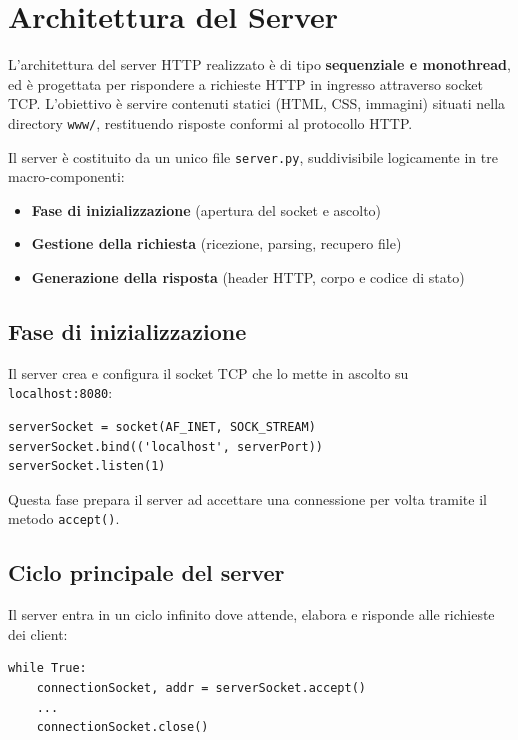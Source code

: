 \documentclass[a4paper,12pt]{report}
\begin{document}
\chapter{Architettura del Server}

L'architettura del server HTTP realizzato è di tipo \textbf{sequenziale e monothread}, ed è progettata per rispondere a richieste HTTP in ingresso attraverso socket TCP. L'obiettivo è servire contenuti statici (HTML, CSS, immagini) situati nella directory \texttt{www/}, restituendo risposte conformi al protocollo HTTP.

Il server è costituito da un unico file \texttt{server.py}, suddivisibile logicamente in tre macro-componenti:
\begin{itemize}
    \item \textbf{Fase di inizializzazione} (apertura del socket e ascolto)
    \item \textbf{Gestione della richiesta} (ricezione, parsing, recupero file)
    \item \textbf{Generazione della risposta} (header HTTP, corpo e codice di stato)
\end{itemize}

\section{Fase di inizializzazione}

Il server crea e configura il socket TCP che lo mette in ascolto su \texttt{localhost:8080}:

\begin{verbatim}
serverSocket = socket(AF_INET, SOCK_STREAM)
serverSocket.bind(('localhost', serverPort))
serverSocket.listen(1)
\end{verbatim}

Questa fase prepara il server ad accettare una connessione per volta tramite il metodo \texttt{accept()}.

\newpage

\section{Ciclo principale del server}

Il server entra in un ciclo infinito dove attende, elabora e risponde alle richieste dei client:

\begin{verbatim}
while True:
    connectionSocket, addr = serverSocket.accept()
    ...
    connectionSocket.close()
\end{verbatim}
\end{document}
